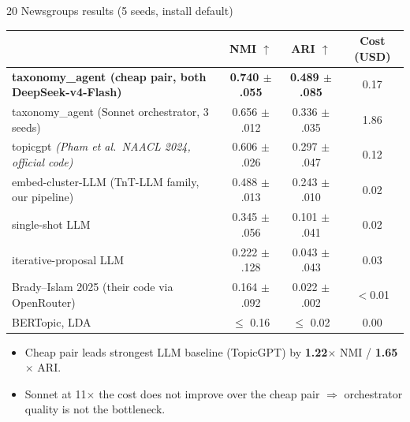 \documentclass[10pt,aspectratio=169]{beamer}
\begin{document}
\begin{frame}{20 Newsgroups results (5 seeds, install default)}
  \centering
  \footnotesize
  \begin{tabular}{lccc}
    \toprule
    & NMI $\uparrow$ & ARI $\uparrow$ & Cost (USD) \\
    \midrule
    \textcolor{ours}{\textbf{taxonomy\_agent (cheap pair, both DeepSeek-v4-Flash)}}
      & \textbf{0.740 $\pm$ .055} & \textbf{0.489 $\pm$ .085} & 0.17 \\
    taxonomy\_agent (Sonnet orchestrator, 3 seeds)
      & 0.656 $\pm$ .012 & 0.336 $\pm$ .035 & 1.86 \\
    \midrule
    topicgpt \emph{(Pham et al.\ NAACL 2024, official code)}
      & 0.606 $\pm$ .026 & 0.297 $\pm$ .047 & 0.12 \\
    embed-cluster-LLM (TnT-LLM family, our pipeline)
      & 0.488 $\pm$ .013 & 0.243 $\pm$ .010 & 0.02 \\
    single-shot LLM
      & 0.345 $\pm$ .056 & 0.101 $\pm$ .041 & 0.02 \\
    iterative-proposal LLM
      & 0.222 $\pm$ .128 & 0.043 $\pm$ .043 & 0.03 \\
    Brady--Islam 2025 (their code via OpenRouter)
      & 0.164 $\pm$ .092 & 0.022 $\pm$ .002 & $<$0.01 \\
    BERTopic, LDA
      & $\leq$ 0.16 & $\leq$ 0.02 & 0.00 \\
    \bottomrule
  \end{tabular}
  \vspace{0.7em}

  \begin{itemize}\itemsep0.1em
    \item Cheap pair leads strongest LLM baseline (TopicGPT) by
          \textbf{1.22$\times$} NMI / \textbf{1.65$\times$} ARI.
    \item Sonnet at 11$\times$ the cost does not improve over the
          cheap pair $\Rightarrow$ orchestrator quality is not the
          bottleneck.
  \end{itemize}
\end{frame}
\end{document}
